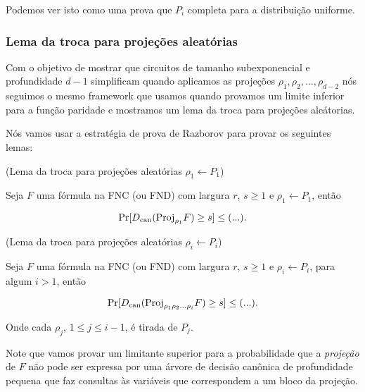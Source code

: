 Podemos ver isto como uma prova que $P_{i}$ completa para a distribuição uniforme.

\subsubsection{Lema da troca para projeções aleatórias}

Com o objetivo de mostrar que circuitos de tamanho subexponencial e profundidade $d - 1$ simplificam quando aplicamos as projeções $\rho_{1}, \rho_{2}, \dots, \rho_{d - 2}$ nós seguimos o mesmo framework que usamos quando provamos um limite inferior para a função paridade e mostramos um lema da troca para projeções aleátorias.

Nós vamos usar a estratégia de prova de Razborov para provar os seguintes lemas:

\begin{lema} (Lema da troca para projeções aleatórias $\rho_{1} \leftarrow P_{1}$) \label{projection_switching_lemma_P1}

Seja $F$ uma fórmula na FNC (ou FND) com largura $r$, $s \geq 1$ e $\rho_{1} \leftarrow P_{1}$, então

\begin{equation*}
	\Pr[D_{\text{can}}(\text{Proj}_{\rho_{1}}F) \geq s] \leq (...).
\end{equation*} 

\end{lema}

\begin{lema} (Lema da troca para projeções aleatórias $\rho_{i} \leftarrow P_{i}$) \label{projection_switching_lemma_Pi}

Seja $F$ uma fórmula na FNC (ou FND) com largura $r$, $s \geq 1$ e $\rho_{i} \leftarrow P_{i}$, para algum $i > 1$, então

\begin{equation*}
	\Pr[D_{\text{can}}(\text{Proj}_{\rho_{1}\rho_{2}\dots\rho_{i}}F) \geq s] \leq (...).
\end{equation*} 

Onde cada $\rho_{j}$, $1 \leq j \leq i - 1$, é tirada de $P_{j}$.

\end{lema}

Note que vamos provar um limitante superior para a probabilidade que a \emph{projeção} de $F$ não pode ser expressa por uma árvore de decisão canônica de profundidade pequena que faz consultas às variáveis que correspondem a um bloco da projeção.

